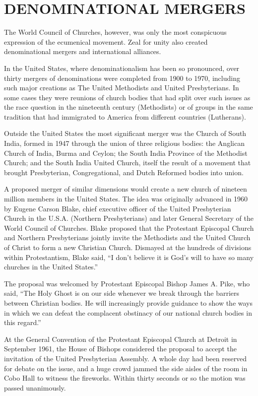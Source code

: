 \section{DENOMINATIONAL MERGERS}

The World Council of Churches, however, was only the most conspicuous expression of the ecumenical
movement. Zeal for unity also created denominational mergers and international alliances.

In the United States, where denominationalism has been so pronounced, over thirty mergers of
denominations were completed from 1900 to 1970, including such major creations as The United
Methodists and United Presbyterians. In some cases they were reunions of church bodies that had
split over such issues as the race question in the nineteenth century (Methodists) or of groups in
the same tradition that had immigrated to America from different countries (Lutherans).

Outside the United States the most significant merger was the Church of South India, formed in 1947
through the union of three religious bodies: the Anglican Church of India, Burma and Ceylon; the
South India Province of the Methodist Church; and the South India United Church, itself the result
of a movement that brought Presbyterian, Congregational, and Dutch Reformed bodies into union.

A proposed merger of similar dimensions would create a new church of nineteen million members in the
United States. The idea was originally advanced in 1960 by Eugene Carson Blake, chief executive
officer of the United Presbyterian Church in the U.S.A. (Northern Presbyterians) and later General
Secretary of the World Council of Churches. Blake proposed that the Protestant Episcopal Church and
Northern Presbyterians jointly invite the Methodists and the United Church of Christ to form a new
Christian Church. Dismayed at the hundreds of divisions within Protestantism, Blake said, “I don’t
believe it is God’s will to have so many churches in the United States.”

The proposal was welcomed by Protestant Episcopal Bishop James A. Pike, who said, “The Holy Ghost is
on our side whenever we break through the barriers between Christian bodies. He will increasingly
provide guidance to show the ways in which we can defeat the complacent obstinacy of our national
church bodies in this regard.”

At the General Convention of the Protestant Episcopal Church at Detroit in September 1961, the House
of Bishops considered the proposal to accept the invitation of the United Presbyterian Assembly. A
whole day had been reserved for debate on the issue, and a huge crowd jammed the side aisles of the
room in Cobo Hall to witness the fireworks. Within thirty seconds or so the motion was passed
unanimously.

